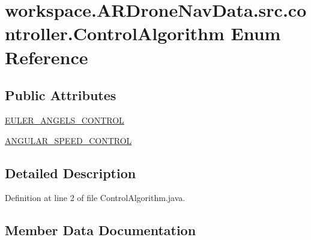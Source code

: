 \hypertarget{enumworkspace_1_1_a_r_drone_nav_data_1_1src_1_1controller_1_1_control_algorithm}{}\section{workspace.\+A\+R\+Drone\+Nav\+Data.\+src.\+controller.\+Control\+Algorithm Enum Reference}
\label{enumworkspace_1_1_a_r_drone_nav_data_1_1src_1_1controller_1_1_control_algorithm}
\subsection*{Public Attributes}
\begin{DoxyCompactItemize}
\item 
\hyperlink{enumworkspace_1_1_a_r_drone_nav_data_1_1src_1_1controller_1_1_control_algorithm_a03138d5ed0be6d9f44da477149e50f82}{E\+U\+L\+E\+R\+\_\+\+A\+N\+G\+E\+L\+S\+\_\+\+C\+O\+N\+T\+R\+O\+L}
\item 
\hyperlink{enumworkspace_1_1_a_r_drone_nav_data_1_1src_1_1controller_1_1_control_algorithm_a066bc7f8231c90e53b86e3713d05cd5d}{A\+N\+G\+U\+L\+A\+R\+\_\+\+S\+P\+E\+E\+D\+\_\+\+C\+O\+N\+T\+R\+O\+L}
\end{DoxyCompactItemize}


\subsection{Detailed Description}


Definition at line 2 of file Control\+Algorithm.\+java.



\subsection{Member Data Documentation}
\hypertarget{enumworkspace_1_1_a_r_drone_nav_data_1_1src_1_1controller_1_1_control_algorithm_a066bc7f8231c90e53b86e3713d05cd5d}{}
